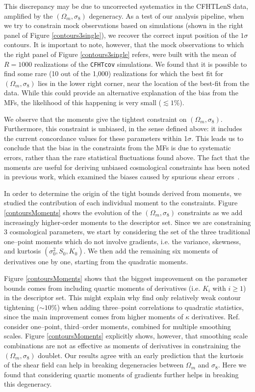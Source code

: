 \documentclass[reprint,aps,prd,superscriptaddress,showkeys,showpacs]{revtex4-1}
\begin{document}
This discrepancy may be due to uncorrected systematics in the CFHTLenS
data, amplified by the $(\Omega_m,\sigma_8)$ degeneracy.  As a test of
our analysis pipeline, when we try to constrain mock observations
based on simulations (shown in the
right panel of Figure \ref{contours3single}), we recover the correct
input position of the $1\sigma$ contours.  It is important to note,
however, that the mock observations to which the right panel of Figure
\ref{contours3single} refers, were built with the mean of $R=1000$
realizations of the \texttt{CFHTcov} simulations. We found that it is
possible to find some rare (10 out of the 1,000) realizations for
which the best fit for $(\Omega_m,\sigma_8)$ lies in the lower right
corner, near the location of the best-fit from the data. While this
could provide an alternative explanation of the bias from the MFs, the
likelihood of this happening is very small ($\lesssim1\%$).


We observe that the moments give the tightest constraint on
$(\Omega_m,\sigma_8)$.  Furthermore, this constraint is unbiased, in
the sense defined above: it includes the current concordance values
for these parameters within 1$\sigma$.  This leads us to conclude that
the bias in the constraints from the MFs is due to systematic errors,
rather than the rare statistical fluctuations found above.
The fact that the moments are useful for deriving unbiased
cosmological constraints has been noted in previous work, which
examined the biases caused by spurious shear
errors~\citep{PetriSpurious}.

In order to determine the origin of the tight bounds derived from
moments, we studied the contribution of each individual moment to the
constraints. Figure \ref{contoursMoments} shows the evolution of the
$(\Omega_m,\sigma_8)$ constraints as we add increasingly higher-order
moments to the descriptor set. Since we are constraining 3
cosmological parameters, we start by considering the set of the three
traditional one--point moments which do not involve gradients,
i.e. the variance, skewness, and kurtosis $(\sigma_0^2,S_0,K_0)$. We
then add the remaining six moments of derivatives one by one, starting
from the quadratic moments. 

Figure \ref{contoursMoments} shows that the biggest improvement on the
parameter bounds comes from including quartic moments of derivatives
(i.e. $K_i$ with $i\ge1$) in the descriptor set. This might explain
why \citep{CFHTFu} find only relatively weak contour tightening
($\sim10\%$) when adding three--point correlations to quadratic
statistics, since the main improvement comes from higher moments of
$\kappa$ derivatives. Ref.~\citep{CFHTFu} consider one--point,
third--order moments, combined for multiple smoothing scales. Figure
\ref{contoursMoments} explicitly shows, however, that smoothing scale
combinations are not as effective as moments of derivatives in
constraining the $(\Omega_m,\sigma_8)$ doublet. Our results agree with
an early prediction \citep{moments4} that the kurtosis of the shear
field can help in breaking degeneracies between $\Omega_m$ and
$\sigma_8$.  Here we found that considering quartic moments of
gradients further helps in breaking this degeneracy.
\end{document}
